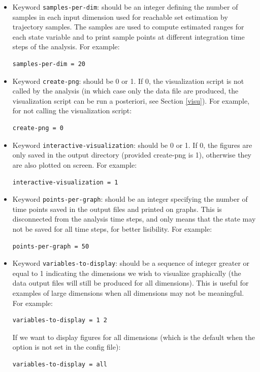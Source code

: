 \documentclass{article}
\begin{document}
\begin{itemize}
\item Keyword \texttt{samples-per-dim}: should be an integer defining the number of samples in each input dimension used  for reachable set estimation by trajectory samples.  The samples are used  to compute estimated ranges for each state variable and to print sample points at different integration time steps of the analysis.
For example:
\begin{verbatim}
samples-per-dim = 20
\end{verbatim}

\item Keyword \texttt{create-png}: should be 0 or 1. If 0, the visualization script is not called by the analysis (in which case only the data file are produced,  the visualization script can be run a posteriori, see Section \ref{visu}).
For example, for not calling the visualization script:
\begin{verbatim}
create-png = 0
\end{verbatim}

\item Keyword \texttt{interactive-visualization}: should be 0 or 1.  If 0,  the figures are only saved in the output directory (provided create-png is 1), otherwise they are also plotted on screen. 
For example:
\begin{verbatim}
interactive-visualization = 1
\end{verbatim}

\item Keyword \texttt{points-per-graph}: should be an integer specifying the number of time points saved in the output files and printed on graphs. This is disconnected from the analysis time steps, and only means that the state may not be saved for all time steps, for better lisibility. 
For example:
\begin{verbatim}
points-per-graph = 50
\end{verbatim}

\item Keyword \texttt{variables-to-display}: should be a sequence of integer greater or equal to 1 indicating the dimensions we wish to visualize graphically (the data output files will still be produced for all dimensions). This is useful for examples of large dimensions when all dimensions may not be meaningful. 
For example:
\begin{verbatim}
variables-to-display = 1 2
\end{verbatim}
If we want to display figures for all dimensions (which is the default when the option is not set in the config file):
\begin{verbatim}
variables-to-display = all
\end{verbatim}
\end{itemize}
\end{document}
